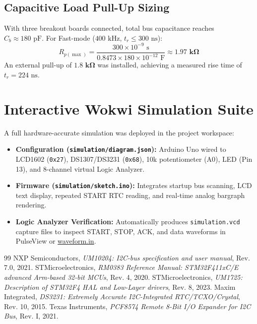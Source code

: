 \documentclass[11pt,a4paper,oneside]{report}
\begin{document}
\section{Capacitive Load Pull-Up Sizing}
With three breakout boards connected, total bus capacitance reaches $C_b \approx 180\text{ pF}$. For Fast-mode ($400\text{ kHz}$, $t_r \le 300\text{ ns}$):
\begin{equation}
R_{p(\max)} = \frac{300\times 10^{-9}\text{ s}}{0.8473 \times 180\times 10^{-12}\text{ F}} \approx \mathbf{1.97\text{ k}\Omega}
\end{equation}
An external pull-up of $\mathbf{1.8\text{ k}\Omega}$ was installed, achieving a measured rise time of $t_r = 224\text{ ns}$.

\chapter{Interactive Wokwi Simulation Suite}
A full hardware-accurate simulation was deployed in the project workspace:
\begin{itemize}
    \item \textbf{Configuration (\texttt{simulation/diagram.json}):} Arduino Uno wired to LCD1602 (\texttt{0x27}), DS1307/DS3231 (\texttt{0x68}), 10k potentiometer (A0), LED (Pin 13), and 8-channel virtual Logic Analyzer.
    \item \textbf{Firmware (\texttt{simulation/sketch.ino}):} Integrates startup bus scanning, LCD text display, repeated START RTC reading, and real-time analog bargraph rendering.
    \item \textbf{Logic Analyzer Verification:} Automatically produces \texttt{simulation.vcd} capture files to inspect START, STOP, ACK, and data waveforms in PulseView or \href{https://waveform.in/}{waveform.in}.
\end{itemize}

\begin{thebibliography}{99}
 NXP Semiconductors, \textit{UM10204: I2C-bus specification and user manual}, Rev. 7.0, 2021.
 STMicroelectronics, \textit{RM0383 Reference Manual: STM32F411xC/E advanced Arm-based 32-bit MCUs}, Rev. 4, 2020.
 STMicroelectronics, \textit{UM1725: Description of STM32F4 HAL and Low-Layer drivers}, Rev. 8, 2023.
 Maxim Integrated, \textit{DS3231: Extremely Accurate I2C-Integrated RTC/TCXO/Crystal}, Rev. 10, 2015.
 Texas Instruments, \textit{PCF8574 Remote 8-Bit I/O Expander for I2C Bus}, Rev. I, 2021.
\end{thebibliography}
\end{document}
